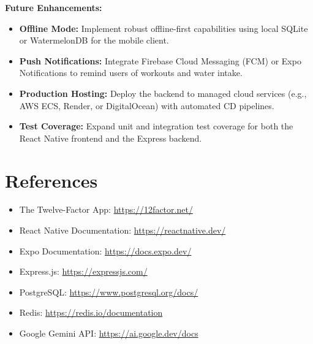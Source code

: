 \documentclass[12pt,a4paper]{article}
\begin{document}
\textbf{Future Enhancements:}
\begin{itemize}
    \item \textbf{Offline Mode:} Implement robust offline-first capabilities using local SQLite or WatermelonDB for the mobile client.
    \item \textbf{Push Notifications:} Integrate Firebase Cloud Messaging (FCM) or Expo Notifications to remind users of workouts and water intake.
    \item \textbf{Production Hosting:} Deploy the backend to managed cloud services (e.g., AWS ECS, Render, or DigitalOcean) with automated CD pipelines.
    \item \textbf{Test Coverage:} Expand unit and integration test coverage for both the React Native frontend and the Express backend.
\end{itemize}

\section{References}
\begin{itemize}
    \item The Twelve-Factor App: \url{https://12factor.net/}
    \item React Native Documentation: \url{https://reactnative.dev/}
    \item Expo Documentation: \url{https://docs.expo.dev/}
    \item Express.js: \url{https://expressjs.com/}
    \item PostgreSQL: \url{https://www.postgresql.org/docs/}
    \item Redis: \url{https://redis.io/documentation}
    \item Google Gemini API: \url{https://ai.google.dev/docs}
\end{itemize}
\end{document}
